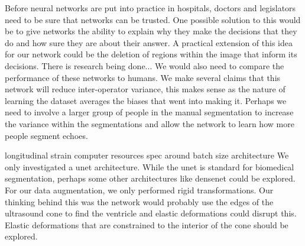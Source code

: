 \documentclass[12pt]{article}
\begin{document}
Before neural networks are put into practice in hospitals, doctors and legislators need to be sure that networks can be trusted.
One possible solution to this would be to give networks the ability to explain why they make the decisions that they do and how sure they are about their answer.
A practical extension of this idea for our network could be the deletion of regions within the image that inform its decisions.
There is research being done...
We would also need to compare the performance of these networks to humans.
We make several claims that this network will reduce inter-operator variance, this makes sense as the nature of learning the dataset averages the biases that went into making it.
Perhaps we need to involve a larger group of people in the manual segmentation to increase the variance within the segmentations and allow the network to learn how more people segment echoes.


longitudinal strain
computer resources
spec around batch size
architecture
We only investigated a unet architecture.
While the unet is standard for biomedical segmentation, perhaps some other architectures like densenet\cite{dense_net} could be explored.
For our data augmentation, we only performed rigid transformations.
Our thinking behind this was the network would probably use the edges of the ultrasound cone to find the ventricle and elastic deformations could disrupt this.
Elastic deformations that are constrained to the interior of the cone should be explored.



\end{document}
